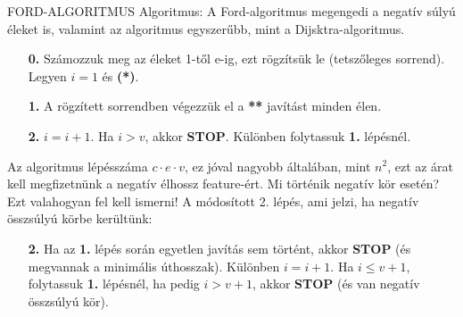 \documentclass[]{article}
\begin{document}
\begin{framed}
FORD-ALGORITMUS Algoritmus: A Ford-algoritmus megengedi a negatív súlyú éleket is, valamint az algoritmus egyszerűbb, mint a Dijsktra-algoritmus.
\begin{itemize}
\item[\textbf{0.}] Számozzuk meg az éleket 1-től e-ig, ezt rögzítsük le (tetszőleges sorrend). Legyen $i = 1$ és \textbf{(*)}.
\item[\textbf{1.}] A rögzített sorrendben végezzük el a \textbf{**} javítást minden élen.
\item[\textbf{2.}] $i = i + 1$. Ha $i > v$, akkor \textbf{STOP}. Különben folytassuk \textbf{1.} lépésnél.
\end{itemize}
Az algoritmus lépésszáma $c\cdot e\cdot v$, ez jóval nagyobb általában, mint $n^2$, ezt az árat kell megfizetnünk a negatív élhossz feature-ért. Mi történik negatív kör esetén? Ezt valahogyan fel kell ismerni! A módosított 2. lépés, ami jelzi, ha negatív összsúlyú körbe kerültünk:
\begin{itemize}
\item[\textbf{2.}] Ha az \textbf{1.} lépés során egyetlen javítás sem történt, akkor \textbf{STOP} (és megvannak a minimális úthosszak). Különben $i = i + 1$. Ha $i \leq v + 1$, folytassuk \textbf{1.} lépésnél, ha pedig $i > v + 1$, akkor \textbf{STOP} (és van negatív összsúlyú kör).
\end{itemize}
\end{framed}
\end{document}
